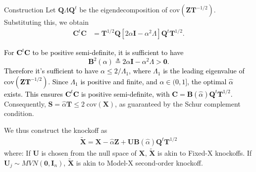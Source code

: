 \documentclass[]{beamer}
\def\tcb{\textcolor{black}}
\def\0{{\mathbf{0}}}
\def\T{{\mathbf{T}}}
\def\tX{{\mathbf{\tilde{X}}}}
\def\X{{\mathbf{X}}}
\def\C{{\mathbf{C}}}
\def\B{{\mathbf{B}}}
\def\Z{{\mathbf{Z}}}
\def\Q{{\mathbf{Q}}}
\def\U{{\mathbf{U}}}
\def\S{{\mathbf{S}}}
\def\I{{\mathbf{I}}}
\def\cov{{\textrm{cov}}}
\begin{document}
\begin{frame}{Construction }
Let $\Q\Lambda\Q^t$ be the eigendecomposition of $\cov(\Z \T^{-1/2}).$ Substituting this, we obtain  
\begin{equation} \label{ctc3}
\begin{aligned}
\C^t \C    &= \T^{1/2} \Q \left[2\alpha \I - \alpha^2 \Lambda\right] \Q^t \T^{1/2}.                     
\end{aligned}
\end{equation}

\tcb{For $\C^t \C$ to be positive semi-definite, it is sufficient to have 
\begin{equation} \label{B2}
\B^2(\alpha) \triangleq 2\alpha\I  - \alpha^2  \Lambda  > \0. 
\end{equation}
Therefore it's sufficient to have $\alpha \le 2 / \Lambda_1$, where $\Lambda_1$ is the leading eigenvalue of $\cov(\Z \T^{-1/2})$.
Since $\Lambda_1$ is positive and finite, and $\alpha \in (0,1]$, the optimal $\hat\alpha$ exists. This ensures $\C^t \C$ is positive semi-definite,  with $\C = \B(\hat\alpha)\Q^t \T^{1/2}.$} Consequently,  $\S=\hat\alpha \T \le 2\;\cov(\X)$, as guaranteed by the Schur complement condition. 

We thus construct the knockoff as 
\begin{equation} \label{reflection.knockoff}
\begin{aligned}
\tX = \X  - \hat\alpha \Z + \U \B(\hat\alpha) \Q^t \T^{1/2} 
\end{aligned}
\end{equation}
where: If $\U$ is chosen from the null space of $\X$, $\tX$ is akin to Fixed-X knockoffs.  If $\U_j \sim MVN(\0,\I_n)$, $\tX$ is akin to Model-X second-order knockoff. 
\end{frame}
\end{document}
